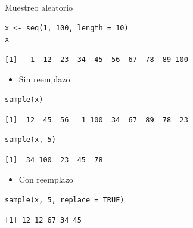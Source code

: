 \documentclass[xcolor={usenames,svgnames,dvipsnames}]{beamer}
\begin{document}
\begin{frame}[fragile,label=sec-3-7]{Muestreo aleatorio}
 \lstset{language=R,label= ,caption= ,numbers=none}
\begin{lstlisting}
x <- seq(1, 100, length = 10)
x
\end{lstlisting}

\begin{verbatim}
[1]   1  12  23  34  45  56  67  78  89 100
\end{verbatim}

\begin{itemize}
\item Sin reemplazo
\end{itemize}
\lstset{language=R,label= ,caption= ,numbers=none}
\begin{lstlisting}
sample(x)
\end{lstlisting}

\begin{verbatim}
[1]  12  45  56   1 100  34  67  89  78  23
\end{verbatim}

\lstset{language=R,label= ,caption= ,numbers=none}
\begin{lstlisting}
sample(x, 5)
\end{lstlisting}

\begin{verbatim}
[1]  34 100  23  45  78
\end{verbatim}

\begin{itemize}
\item Con reemplazo
\end{itemize}
\lstset{language=R,label= ,caption= ,numbers=none}
\begin{lstlisting}
sample(x, 5, replace = TRUE)
\end{lstlisting}

\begin{verbatim}
[1] 12 12 67 34 45
\end{verbatim}
\end{frame}
\end{document}
